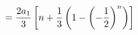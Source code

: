 \documentclass[preview]{standalone}
\begin{document}
\begin{align*}
\special{dvisvgm:raw <g id='unique000'>}=\frac{2a_1}{3}\left[n+\frac{1}{3}\left(1-\left(-\frac{1}{2}\right)^n\right)\right]\special{dvisvgm:raw </g>}
\end{align*}
\end{document}
